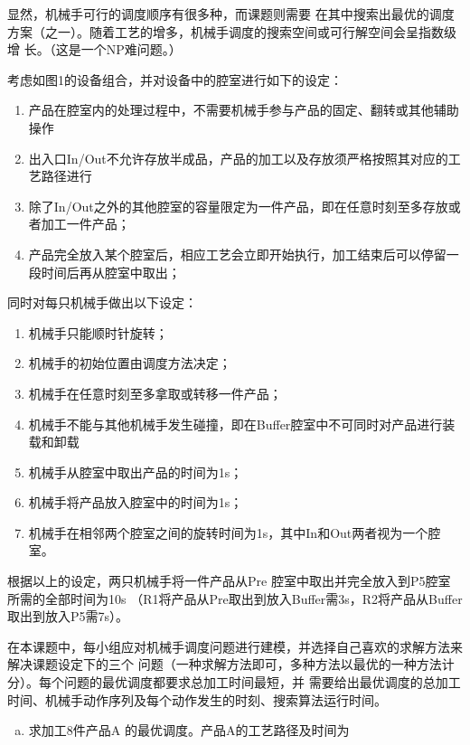\documentclass{ctexart}
\begin{document}
{{        显然，机械手可行的调度顺序有很多种，而课题则需要
        在其中搜索出最优的调度方案（之一）。随着工艺的增多，机械手调度的搜索空间或可行解空间会呈指数级增
        长。（这是一个NP难问题。）

        考虑如图1的设备组合，并对设备中的腔室进行如下的设定：
        
        \begin{enumerate}
        	\item 产品在腔室内的处理过程中，不需要机械手参与产品的固定、翻转或其他辅助操作
        	\item 出入口In/Out不允许存放半成品，产品的加工以及存放须严格按照其对应的工艺路径进行
        	\item 除了In/Out之外的其他腔室的容量限定为一件产品，即在任意时刻至多存放或者加工一件产品；
        	\item 产品完全放入某个腔室后，相应工艺会立即开始执行，加工结束后可以停留一段时间后再从腔室中取出；
        \end{enumerate}


        同时对每只机械手做出以下设定：
        
        \begin{enumerate}
        	\item 机械手只能顺时针旋转；
        	\item 机械手的初始位置由调度方法决定；
        	\item 机械手在任意时刻至多拿取或转移一件产品；
        	\item 机械手不能与其他机械手发生碰撞，即在Buffer腔室中不可同时对产品进行装载和卸载
        	\item 机械手从腔室中取出产品的时间为1s；
        	\item 机械手将产品放入腔室中的时间为1s；
        	\item 机械手在相邻两个腔室之间的旋转时间为1s，其中In和Out两者视为一个腔室。
        \end{enumerate}


        根据以上的设定，两只机械手将一件产品从Pre 腔室中取出并完全放入到P5腔室所需的全部时间为10s
        （R1将产品从Pre取出到放入Buffer需3s，R2将产品从Buffer取出到放入P5需7s）。

        在本课题中，每小组应对机械手调度问题进行建模，并选择自己喜欢的求解方法来解决课题设定下的三个
        问题（一种求解方法即可，多种方法以最优的一种方法计分）。每个问题的最优调度都要求总加工时间最短，并
        需要给出最优调度的总加工时间、机械手动作序列及每个动作发生的时刻、搜索算法运行时间。

		\begin{enumerate}[(a)]
			\item {求加工8件产品A 的最优调度。产品A的工艺路径及时间为
				
}
\end{enumerate}}}
\end{document}
